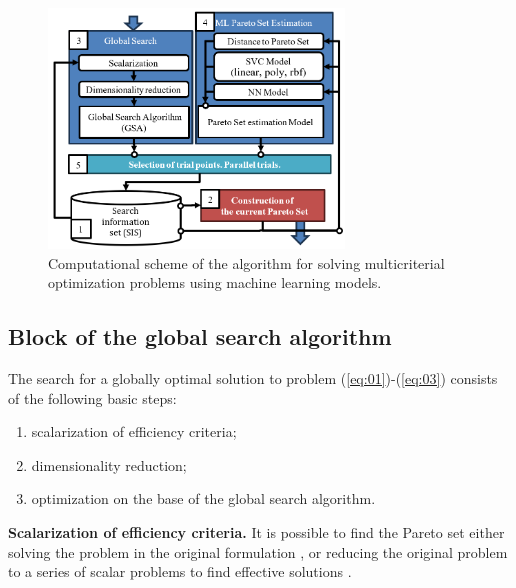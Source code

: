 \documentclass[runningheads]{llncs}
\begin{document}
\begin{figure}
\center
\includegraphics[width=0.7\textwidth]{fig1.png}
\caption{Computational scheme of the algorithm for solving multicriterial optimization problems using machine learning models.} \label{fig1}
\end{figure}


\subsection{Block of the global search algorithm}
\label{subsec31}

The search for a globally optimal solution to problem (\ref{eq:01})-(\ref{eq:03}) consists of the following basic steps:
\begin{enumerate}
	\item scalarization of efficiency criteria;
	\item dimensionality reduction;
	\item optimization on the base of the global search algorithm.
\end{enumerate}

\textbf{Scalarization of efficiency criteria.} It is possible to find the Pareto set either solving the problem in the original formulation \cite{Evtushenko2014,DPA02,Durillo2010,Mostaghim2007,Nebro2009,RC05,Zitzler2001}, or reducing the original problem to a series of scalar problems to find effective solutions \cite{Pardalos2017,Konnov2025,Gergel2019_2,Gergel2018,GergelKozinov2020}. 
\end{document}
